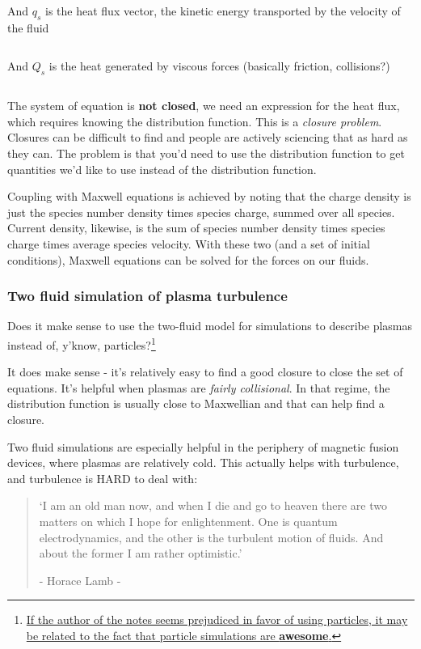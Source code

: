 \documentclass[PlasmaNotes.tex]{subfiles}
\begin{document}
\[ \]

And $q_s$ is the heat flux vector, the kinetic energy transported by the velocity of the fluid

\[ \]

And $Q_s$ is the heat generated by viscous forces (basically friction, collisions?)

\[ \]

The system of equation is \textbf{not closed}, we need an expression for the heat flux, which requires knowing the distribution function. This is a \emph{closure problem}. Closures can be difficult to find and people are actively sciencing that as hard as they can. The problem is that you'd need to use the distribution function to get quantities we'd like to use instead of the distribution function.

Coupling with Maxwell equations is achieved by noting that the charge density is just the species number density times species charge, summed over all species. Current density, likewise, is the sum of species number density times species charge times average species velocity. With these two (and a set of initial conditions), Maxwell equations can be solved for the forces on our fluids.

\subsubsection{Two fluid simulation of plasma turbulence}

Does it make sense to use the two-fluid model for simulations to describe plasmas instead of, y'know, particles?\footnote{\href{https://www.youtube.com/watch?v=5sGKuoBnTn0&feature=youtu.be}{If the author of the notes seems prejudiced in favor of using particles, it may be related to the fact that particle simulations are \textbf{awesome}.}}

It does make sense - it's relatively easy to find a good closure to close the set of equations. It's helpful when plasmas are \emph{fairly collisional}. In that regime, the distribution function is usually close to Maxwellian and that can help find a closure.

Two fluid simulations are especially helpful in the periphery of magnetic fusion devices, where plasmas are relatively cold. This actually helps with turbulence, and turbulence is HARD to deal with:

\begin{quotation}
	`I am an old man now, and when I die and go to heaven there are two matters on which I hope for enlightenment. One is quantum electrodynamics, and the other is the turbulent motion of fluids. And about the former I am rather optimistic.'
	
- Horace Lamb -
\end{quotation}
\end{document}
